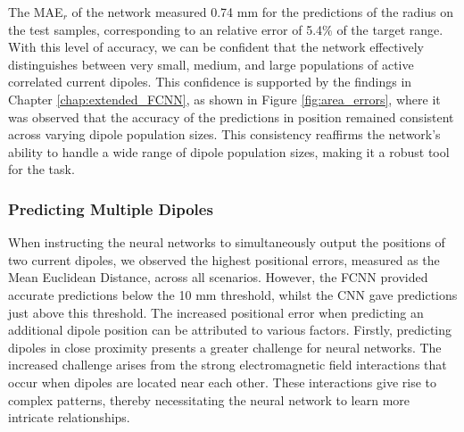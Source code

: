 \documentclass[a4paper, UKenglish, 11pt]{uiomaster}
\begin{document}
The MAE$_{r}$ of the network measured 0.74 mm for the predictions of the radius on the test samples, corresponding to an relative error of 5.4$\%$ of the target range. With this level of accuracy, we can be confident that the network effectively distinguishes between very small, medium, and large populations of active correlated current dipoles. This confidence is supported by the findings in Chapter \ref{chap:extended_FCNN}, as shown in Figure \ref{fig:area_errors}, where it was observed that the accuracy of the predictions in position remained consistent across varying dipole population sizes. This consistency reaffirms the network's ability to handle a wide range of dipole population sizes, making it a robust tool for the task.


\subsubsection{Predicting Multiple Dipoles}
When instructing the neural networks to simultaneously output the positions of two current dipoles, we observed the highest positional errors, measured as the Mean Euclidean Distance, across all scenarios. However, the FCNN provided accurate predictions below the 10 mm threshold, whilst the CNN gave predictions just above this threshold.
The increased positional error when predicting an additional dipole position can be attributed to various factors. Firstly, predicting dipoles in close proximity presents a greater challenge for neural networks. The increased challenge arises from the strong electromagnetic field interactions that occur when dipoles are located near each other.  These interactions give rise to complex patterns, thereby necessitating the neural network to learn more intricate relationships.
\end{document}

